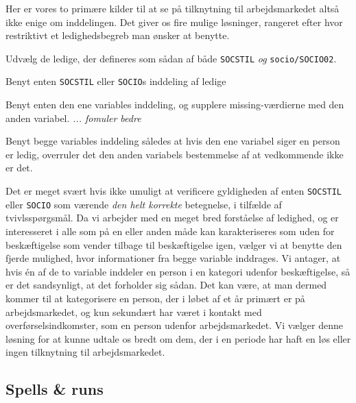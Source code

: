 % 
Her er vores to primære kilder til at se på tilknytning til arbejdsmarkedet altså ikke enige om inddelingen. Det giver os fire mulige løsninger, rangeret efter hvor restriktivt et ledighedsbegreb man ønsker at benytte.
%
\begin{description} [topsep=6pt,itemsep=-1ex]
  \item[Restriktiv] Udvælg de ledige, der defineres som sådan af både \texttt{SOCSTIL} \emph{og} \texttt{socio/SOCIO02}.
  \item[Semirestriktiv] Benyt enten \texttt{SOCSTIL} eller \texttt{SOCIO}s inddeling af ledige
  \item[Semibred] Benyt enten den ene variables inddeling, og supplere missing-værdierne med den anden variabel. \emph{... fomuler bedre}
 \item[Bred] Benyt begge variables inddeling således at hvis den ene variabel siger en person er ledig, overruler det den anden variabels bestemmelse af at vedkommende ikke er det.
\end{description}
%
Det er meget svært hvis ikke umuligt at verificere gyldigheden af enten \texttt{SOCSTIL} eller \texttt{SOCIO} som værende \emph{den helt korrekte} betegnelse, i tilfælde af tvivlsspørgsmål. Da vi arbejder med en meget bred forståelse af ledighed, og er interesseret i alle som på en eller anden måde kan karakteriseres som uden for beskæftigelse som vender tilbage til beskæftigelse igen, vælger vi at benytte den fjerde mulighed, hvor informationer fra begge variable inddrages. Vi antager, at hvis én af de to variable inddeler en person i en kategori udenfor beskæftigelse, så er det sandsynligt, at det forholder sig sådan. Det kan være, at man dermed kommer til at kategorisere en person, der i løbet af et år primært er på arbejdsmarkedet, og kun sekundært har været i kontakt med overførselsindkomster, som en person udenfor arbejdsmarkedet. Vi vælger denne løsning for at kunne udtale os bredt om dem, der i en periode har haft en løs eller ingen tilknytning til arbejdsmarkedet. 



\subsection{Spells \& runs \label{ledig_spellsrun}} 

